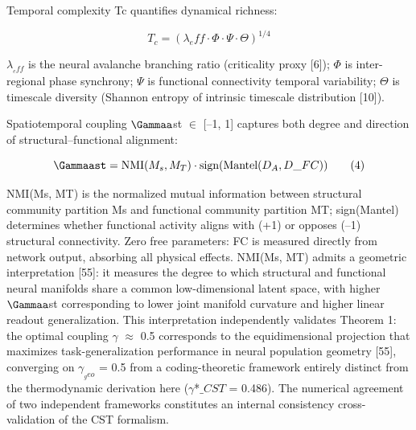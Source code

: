 \documentclass[a4paper,12pt]{article}
\begin{document}
Temporal complexity Tc quantifies dynamical richness:


\begin{equation}

T_c = (\lambda_eff \cdot \Phi \cdot \Psi \cdot \Theta)^{1/4} \tag{3}

\end{equation}


$\lambda_{_eff}$ is the neural avalanche branching ratio (criticality proxy [6]); $\Phi$ is inter-regional phase synchrony; $\Psi$ is functional connectivity temporal variability; $\Theta$ is timescale diversity (Shannon entropy of intrinsic timescale distribution [10]).


Spatiotemporal coupling $\Gammaa$st $\in$ [--1, 1] captures both degree and direction of structural--functional alignment:


\begin{equation}

\Gammaast = \text{NMI}(M_s, M_T) \cdot \text{sign}(\text{Mantel}(D_A, D\_{FC})) \tag{4}

\end{equation}


NMI(Ms, MT) is the normalized mutual information between structural community partition Ms and functional community partition MT; sign(Mantel) determines whether functional activity aligns with (+1) or opposes (--1) structural connectivity. Zero free parameters: FC is measured directly from network output, absorbing all physical effects. NMI(Ms, MT) admits a geometric interpretation [55]: it measures the degree to which structural and functional neural manifolds share a common low-dimensional latent space, with higher $\Gammaa$st corresponding to lower joint manifold curvature and higher linear readout generalization. This interpretation independently validates Theorem 1: the optimal coupling $\gamma$ $\approx$ 0.5 corresponds to the equidimensional projection that maximizes task-generalization performance in neural population geometry [55], converging on $\gamma_{_geo}$ = 0.5 from a coding-theoretic framework entirely distinct from the thermodynamic derivation here ($\gamma$*$\_CST$ = 0.486). The numerical agreement of two independent frameworks constitutes an internal consistency cross-validation of the CST formalism.
\end{document}
